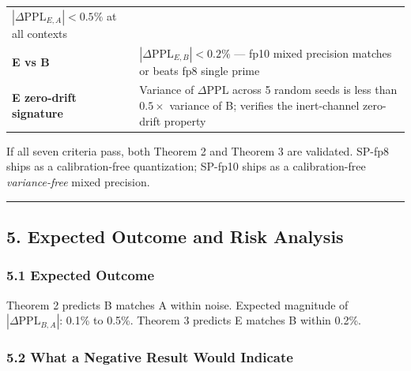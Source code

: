 \documentclass[
  11pt,
]{article}
\begin{document}
\begin{longtable}[]{@{}ll@{}}
\begin{minipage}[t]{0.47\columnwidth}
\(|\Delta\mathrm{PPL}_{E,A}| < 0.5\%\) at all contexts\strut
\end{minipage}\tabularnewline
\begin{minipage}[t]{0.47\columnwidth}\raggedright
\textbf{E vs B}\strut
\end{minipage} & \begin{minipage}[t]{0.47\columnwidth}\raggedright
\(|\Delta\mathrm{PPL}_{E,B}| < 0.2\%\) --- fp10 mixed precision matches
or beats fp8 single prime\strut
\end{minipage}\tabularnewline
\begin{minipage}[t]{0.47\columnwidth}\raggedright
\textbf{E zero-drift signature}\strut
\end{minipage} & \begin{minipage}[t]{0.47\columnwidth}\raggedright
Variance of \(\Delta\mathrm{PPL}\) across 5 random seeds is less than
\(0.5\times\) variance of B; verifies the inert-channel zero-drift
property\strut
\end{minipage}\tabularnewline
\bottomrule
\end{longtable}

If all seven criteria pass, both Theorem 2 and Theorem 3 are validated.
SP-fp8 ships as a calibration-free quantization; SP-fp10 ships as a
calibration-free \emph{variance-free} mixed precision.

\begin{center}\rule{0.5\linewidth}{0.5pt}\end{center}

\hypertarget{expected-outcome-and-risk-analysis}{%
\subsection{5. Expected Outcome and Risk
Analysis}\label{expected-outcome-and-risk-analysis}}

\hypertarget{expected-outcome}{%
\subsubsection{5.1 Expected Outcome}\label{expected-outcome}}

Theorem 2 predicts B matches A within noise. Expected magnitude of
\(|\Delta\mathrm{PPL}_{B,A}|\): 0.1\% to 0.5\%. Theorem 3 predicts E
matches B within 0.2\%.

\hypertarget{what-a-negative-result-would-indicate}{%
\subsubsection{5.2 What a Negative Result Would
Indicate}\label{what-a-negative-result-would-indicate}}
\end{document}
